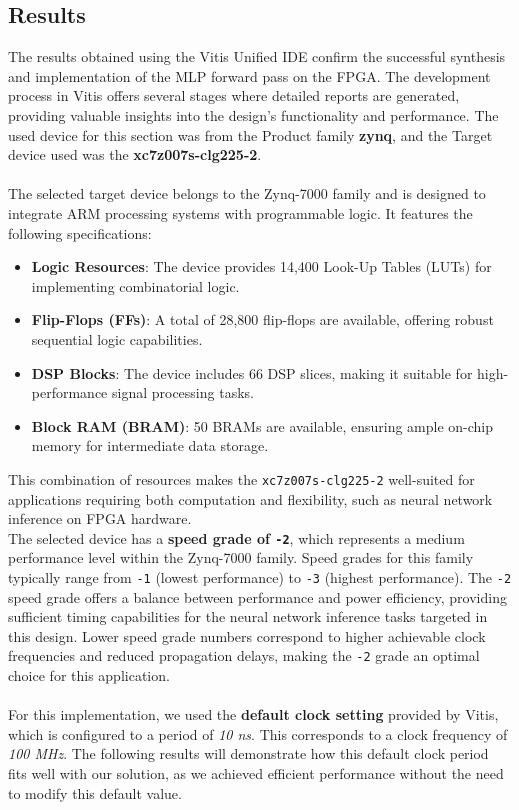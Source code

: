 \documentclass{article}
\begin{document}
\subsection{Results}
The results obtained using the Vitis Unified IDE confirm the successful synthesis and implementation of the MLP forward pass on the FPGA. The development process in Vitis offers several stages where detailed reports are generated, providing valuable insights into the design's functionality and performance. The used device for this section was from the Product family \textbf{zynq}, and the Target device used was the \textbf{xc7z007s-clg225-2}.\\\\
The selected target device belongs to the Zynq-7000 family and is designed to integrate ARM processing systems with programmable logic. It features the following specifications:
\begin{itemize}
    \item \textbf{Logic Resources}: The device provides 14,400 Look-Up Tables (LUTs) for implementing combinatorial logic.
    \item \textbf{Flip-Flops (FFs)}: A total of 28,800 flip-flops are available, offering robust sequential logic capabilities.
    \item \textbf{DSP Blocks}: The device includes 66 DSP slices, making it suitable for high-performance signal processing tasks.
    \item \textbf{Block RAM (BRAM)}: 50 BRAMs are available, ensuring ample on-chip memory for intermediate data storage.
\end{itemize}
This combination of resources makes the \texttt{xc7z007s-clg225-2} well-suited for applications requiring both computation and flexibility, such as neural network inference on FPGA hardware.\\

The selected device has a \textbf{speed grade of \texttt{-2}}, which represents a medium performance level within the Zynq-7000 family. Speed grades for this family typically range from \texttt{-1} (lowest performance) to \texttt{-3} (highest performance). The \texttt{-2} speed grade offers a balance between performance and power efficiency, providing sufficient timing capabilities for the neural network inference tasks targeted in this design. Lower speed grade numbers correspond to higher achievable clock frequencies and reduced propagation delays, making the \texttt{-2} grade an optimal choice for this application.
\\\\For this implementation, we used the \textbf{default clock setting} provided by Vitis, which is configured to a period of \textit{10 ns}. This corresponds to a clock frequency of \textit{100 MHz}. The following results will demonstrate how this default clock period fits well with our solution, as we achieved efficient performance without the need to modify this default value.
\end{document}
